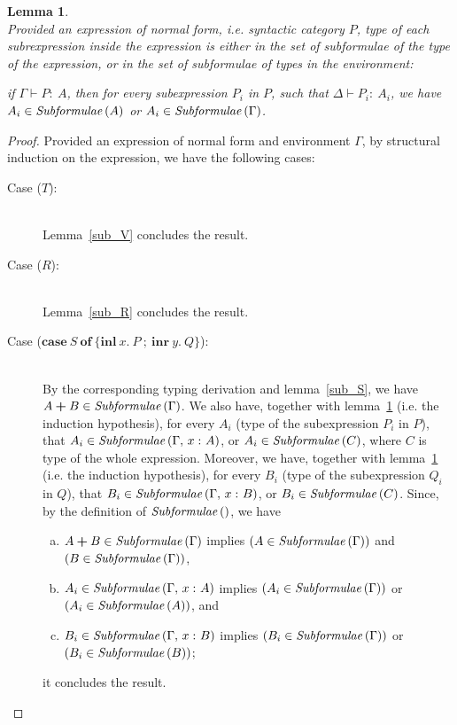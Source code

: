 \documentclass[a4paper]{article}
\newcommand{\typecolor}{}
\newcommand{\termcolor}{}
\newcommand{\tp}[1]{{\typecolor #1}}
\newcommand{\tm}[1]{{\termcolor #1}}
\newtheorem{lemma}[theorem]{Lemma}
\newcommand{\typsum}[2]{#1\boldsymbol{+}#2}
\newcommand{\expcas}[5]{\mathbf{case}\ #1\ \mathbf{of}\ \boldsymbol{\{}\mathbf{inl}\ #2.\ #3\ \boldsymbol{;}\ \mathbf{inr}\ #4.\ #5\boldsymbol{\}}}
\newcommand{\typing}[2]{\tm{#1:\ }\tp{#2}}
\newcommand{\typenvcon}[2]{\tp{\Gamma,}\ \typing{#1}{#2}}
\newcommand{\txt}[1]{\text{\textit{#1}}}
\newcommand{\subformulae}[1]{\txt{Subformulae}\,(#1)}
\begin{document}
\begin{lemma}\ \\
\label{sub_P}
Provided an expression of normal form, i.e. syntactic category $P$,
type of each subrexpression inside the expression is either in the set of
subformulae of the type of the expression, or in the set
of subformulae of types in the environment:

 if $\Gamma \vdash \typing{P}{A}$, then for every subexpression $P_i$
 in $P$, such that $\Delta \vdash \typing{P_i}{A_i}$, we have $A_i \in
 \subformulae{A}$ or $A_i \in \subformulae{\Gamma}$. 
\end{lemma}
\begin{proof}
Provided an expression of normal form and environment $\Gamma$,
by structural induction on the expression, we have the following cases:
\begin{description}
\item[Case ($T$):]\ \\
  Lemma~\ref{sub_V} concludes the result.
\item[Case ($R$):]\ \\
  Lemma~\ref{sub_R} concludes the result.
\item[Case ($\expcas{S}{x}{P}{y}{Q}$):]\ \\
  By the corresponding typing derivation and lemma~\ref{sub_S}, we
  have $\typsum{A}{B} \in \subformulae{\Gamma}$. We also have,
  together with lemma~\ref{sub_P} (i.e. the induction hypothesis), for
  every $A_i$ (type of the subexpression $P_i$ in $P$), that $A_i \in
  \subformulae{\typenvcon{x}{A}}$, or $A_i \in \subformulae{C}$, where
  $C$ is type of the whole expression. Moreover, we have, together
  with lemma~\ref{sub_P} (i.e. the induction hypothesis), for every
  $B_i$ (type of the subexpression $Q_i$ in $Q$), that $B_i \in
  \subformulae{\typenvcon{x}{B}}$, or $B_i \in \subformulae{C}$.
  Since, by the definition of $\subformulae{}$, we have
  \begin{enumerate}[(a)] 
     \item $\typsum{A}{B} \in \subformulae{\Gamma}$ implies $(A \in \subformulae{\Gamma})$ and $(B \in \subformulae{\Gamma})$,
     \item $A_i \in \subformulae{\typenvcon{x}{A}}$ implies $(A_i \in \subformulae{\Gamma})$ or $(A_i \in \subformulae{A})$, and
     \item $B_i \in \subformulae{\typenvcon{x}{B}}$ implies $(B_i \in \subformulae{\Gamma})$ or $(B_i \in \subformulae{B})$; 
  \end{enumerate}
  it concludes the result. 

\end{description}
\end{proof}
\end{document}
